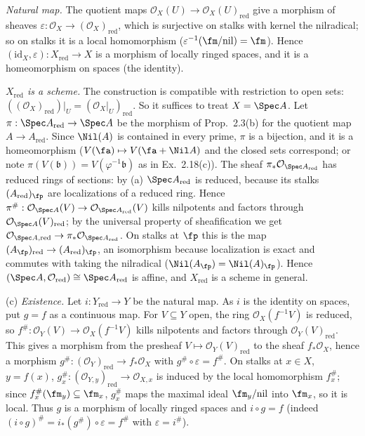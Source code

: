 \documentclass[11pt]{article}
\begin{document}
\emph{Natural map.} The quotient maps $\mathcal O_X(U)\to\mathcal O_X(U)_{\mathrm{red}}$ give a morphism of sheaves $\varepsilon:\mathcal O_X\to(\mathcal O_X)_{\mathrm{red}}$, which is surjective on stalks with kernel the nilradical; so on stalks it is a local homomorphism ($\varepsilon^{-1}(\fm/\mathrm{nil})=\fm$). Hence $(\mathrm{id}_X,\varepsilon):X_{\mathrm{red}}\to X$ is a morphism of locally ringed spaces, and it is a homeomorphism on spaces (the identity).

\emph{$X_{\mathrm{red}}$ is a scheme.} The construction is compatible with restriction to open sets: $((\mathcal O_X)_{\mathrm{red}})|_U=(\mathcal O_X|_U)_{\mathrm{red}}$. So it suffices to treat $X=\Spec A$. Let $\pi:\Spec A_{\mathrm{red}}\to\Spec A$ be the morphism of Prop.~2.3(b) for the quotient map $A\to A_{\mathrm{red}}$. Since $\Nil(A)$ is contained in every prime, $\pi$ is a bijection, and it is a homeomorphism ($V(\fa)\mapsto V(\fa+\Nil A)$ and the closed sets correspond; or note $\pi(V(\mathfrak b))=V(\varphi^{-1}\mathfrak b)$ as in Ex.~2.18(c)). The sheaf $\pi_*\mathcal O_{\Spec A_{\mathrm{red}}}$ has reduced rings of sections: by (a) $\Spec A_{\mathrm{red}}$ is reduced, because its stalks $(A_{\mathrm{red}})_{\fp}$ are localizations of a reduced ring. Hence $\pi^\#:\mathcal O_{\Spec A}(V)\to\mathcal O_{\Spec A_{\mathrm{red}}}(V)$ kills nilpotents and factors through $\mathcal O_{\Spec A}(V)_{\mathrm{red}}$; by the universal property of sheafification we get $\mathcal O_{\Spec A,\mathrm{red}}\to\pi_*\mathcal O_{\Spec A_{\mathrm{red}}}$. On stalks at $\fp$ this is the map $(A_\fp)_{\mathrm{red}}\to(A_{\mathrm{red}})_\fp$, an isomorphism because localization is exact and commutes with taking the nilradical ($\Nil(A_\fp)=\Nil(A)_\fp$). Hence $(\Spec A,\mathcal O_{\mathrm{red}})\cong\Spec A_{\mathrm{red}}$ is affine, and $X_{\mathrm{red}}$ is a scheme in general.

(c) \emph{Existence.} Let $i:Y_{\mathrm{red}}\to Y$ be the natural map. As $i$ is the identity on spaces, put $g=f$ as a continuous map. For $V\subseteq Y$ open, the ring $\mathcal O_X(f^{-1}V)$ is reduced, so $f^\#:\mathcal O_Y(V)\to\mathcal O_X(f^{-1}V)$ kills nilpotents and factors through $\mathcal O_Y(V)_{\mathrm{red}}$. This gives a morphism from the presheaf $V\mapsto\mathcal O_Y(V)_{\mathrm{red}}$ to the sheaf $f_*\mathcal O_X$, hence a morphism $g^\#:(\mathcal O_Y)_{\mathrm{red}}\to f_*\mathcal O_X$ with $g^\#\circ\varepsilon=f^\#$. On stalks at $x\in X$, $y=f(x)$, $g^\#_x:(\mathcal O_{Y,y})_{\mathrm{red}}\to\mathcal O_{X,x}$ is induced by the local homomorphism $f^\#_x$; since $f^\#_x(\fm_y)\subseteq\fm_x$, $g^\#_x$ maps the maximal ideal $\fm_y/\mathrm{nil}$ into $\fm_x$, so it is local. Thus $g$ is a morphism of locally ringed spaces and $i\circ g=f$ (indeed $(i\circ g)^\#=i_*(g^\#)\circ\varepsilon=f^\#$ with $\varepsilon=i^\#$).
\end{document}

